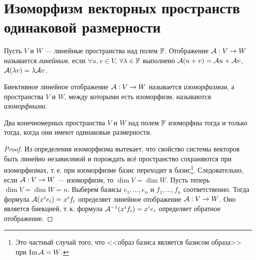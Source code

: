 \section{Изоморфизм векторных пространств одинаковой размерности}

\begin{definition}
    Пусть $V$ и $W$ --- линейные пространства над полем $\mathbb{F}$. Отображение $\mathcal{A}: V \to W$ называется \textit{линейным}, если $\forall u, v \in V$, $\forall \lambda \in \mathbb{F}$ выполнено $\mathcal{A}(u + v) = \mathcal{A} u + \mathcal{A} v$, $\mathcal{A}(\lambda v) = \lambda\mathcal{A} v$.
\end{definition}

\begin{definition}
    Биективное линейное отображение $\mathcal{A}: V \to W$ называется \textit{изоморфизмом}, а пространства $V$ и $W$, между которыми есть изоморфизм, называются \textit{изоморфными}.
\end{definition}

\begin{theorem}
    Два конечномерных пространства $V$ и $W$ над полем $\mathbb{F}$ изоморфны тогда и только тогда, когда они имеют одинаковые размерности.
\end{theorem}

\begin{proof}
    Из определения изоморфизма вытекает, что свойство системы векторов быть линейно независимой и порождать всё пространство сохраняются при изоморфизмах, т.\,е. при изоморфизме базис переходит в базис\footnote{Это частный случай того, что <<образ базиса является базисом образа>> при $\operatorname{Im} \mathcal{A} = W$.}. Следовательно, если $\mathcal{A}: V \to W$ --- изоморфизм, то $\dim V = \dim W$. Пусть теперь $\dim V = \dim W = n$. Выберем базисы $e_1, \ldots, e_n$ и $f_1, \ldots, f_n$ соответственно. Тогда формула $\mathcal{A}(x^ie_i) = x^if_i$ определяет линейное отображение $\mathcal{A}: V \to W$. Оно является биекцией, т.\,к. формула $\mathcal{A}^{-1}(x^if_i) = x^ie_i$ определяет обратное отображение.
\end{proof}

